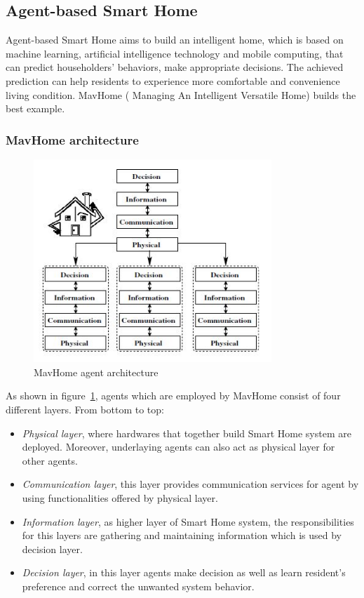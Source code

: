\subsection{Agent-based Smart Home} \label{secAgent}
Agent-based Smart Home aims to build an intelligent home, which is based on machine learning, artificial intelligence technology and mobile computing, that can predict householders' behaviors, make appropriate decisions. The achieved prediction can help residents to experience more comfortable and convenience living condition. MavHome ( Managing An Intelligent Versatile Home)\cite{smart_home_agent} builds the best example. 

\subsubsection{MavHome architecture}
 \begin{figure}[!htbp]
	\centering
	\includegraphics[width=0.8\textwidth]{smart-home-agent.jpg}
		\caption{MavHome agent architecture\cite{smart_home_agent}}
	\label{fig:smart-home-agent}
\end{figure}
As shown in figure~\ref{fig:smart-home-agent}, agents which are employed by MavHome consist of four different layers. From bottom to top:
\begin{itemize}
\item \emph{Physical layer}, where hardwares that together build Smart Home system are deployed. Moreover, underlaying agents can also act as physical layer for other agents.
\item \emph{Communication layer}, this layer provides communication services for agent by using functionalities offered by physical layer.
\item \emph{Information layer}, as higher layer of Smart Home system,  the responsibilities for this layers are gathering and maintaining information which is used by decision layer.
\item \emph{Decision layer}, in this layer agents make decision as well as learn resident's preference and correct the unwanted system behavior.
\end{itemize}
